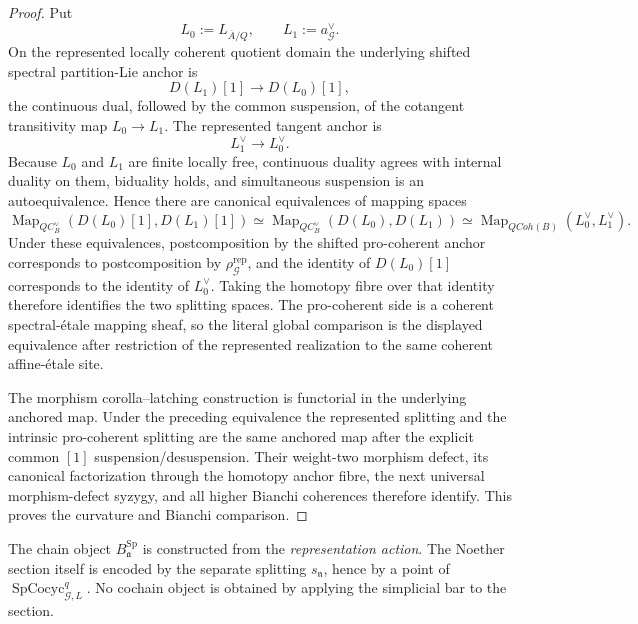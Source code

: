 \begin{proof}
Put
\[
L_0:=L_{\overline A/Q},
\qquad
L_1:=a_{\mathcal G}^{\vee}.
\]
On the represented locally coherent quotient domain the underlying shifted
spectral partition-Lie anchor is
\[
D(L_1)[1]
\longrightarrow
D(L_0)[1],
\]
the continuous dual, followed by the common suspension, of the cotangent
transitivity map $L_0\to L_1$.  The represented tangent anchor is
\[
L_1^\vee
\longrightarrow
L_0^\vee.
\]
Because $L_0$ and $L_1$ are finite locally free, continuous duality agrees with
internal duality on them, biduality holds, and simultaneous suspension is an
autoequivalence.  Hence there are canonical equivalences of mapping spaces
\[
\operatorname{Map}_{QC_B^\vee}
\left(D(L_0)[1],D(L_1)[1]\right)
\simeq
\operatorname{Map}_{QC_B^\vee}
\left(D(L_0),D(L_1)\right)
\simeq
\operatorname{Map}_{QCoh(B)}
\left(L_0^\vee,L_1^\vee\right).
\]
Under these equivalences, postcomposition by the shifted pro-coherent anchor
corresponds to postcomposition by $\rho_{\mathcal G}^{\mathrm{rep}}$, and the
identity of $D(L_0)[1]$ corresponds to the identity of $L_0^\vee$.  Taking the
homotopy fibre over that identity therefore identifies the two splitting spaces.
The pro-coherent side is a coherent spectral-\'etale mapping sheaf, so the literal
global comparison is the displayed equivalence after restriction of the
represented realization to the same coherent affine-\'etale site.

The morphism corolla--latching construction is functorial in the underlying
anchored map.  Under the preceding equivalence the represented splitting and the
intrinsic pro-coherent splitting are the same anchored map after the explicit
common $[1]$ suspension/desuspension.  Their weight-two morphism defect, its
canonical factorization through the homotopy anchor fibre, the next universal
morphism-defect syzygy, and all higher Bianchi coherences therefore identify.  This
proves the curvature and Bianchi comparison.
\end{proof}

\begin{remark}
\label{rem:symmetry-noether-the-noether-section-is-not-applied-to-the-bar}
The chain object $B^{\mathrm{Sp}}_{\mathfrak a}$ is constructed from the
\emph{representation action}.  The Noether section itself is encoded by the
separate splitting $s_{\mathfrak n}$, hence by a point of
$\operatorname{SpCocyc}_{\mathcal G,L}^{q}$.  No cochain object is obtained by
applying the simplicial bar to the section.
\end{remark}

